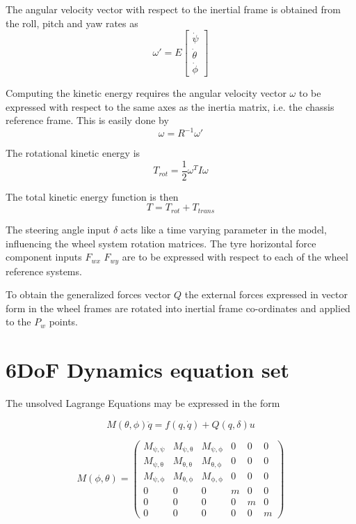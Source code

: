 The angular velocity vector with respect to the inertial frame is obtained from the roll, pitch and yaw rates as
$$
\omega' = E\begin{bmatrix}
\dot\psi \\
\dot\theta \\
\dot\phi
\end{bmatrix}
$$

Computing the kinetic energy requires the angular velocity vector $\omega$ to be expressed with respect to the same axes as the inertia matrix, i.e. the chassis reference frame. This is easily done by
$$\omega = R^{-1}\omega'$$

The rotational kinetic energy is
$$ T_{rot} = \frac{1}{2}\omega^T I \omega $$

The total kinetic energy function is then
$$ T = T_{rot} + T_{trans} $$

The steering angle input $\delta$ acts like a time varying parameter in the model, influencing the wheel system rotation matrices.
The tyre horizontal force component inputs $F_{wx}$ $F_{wy}$ are to be expressed with respect to each of the wheel reference systems.

To obtain the generalized forces vector $Q$ the external forces expressed in vector form in the wheel frames are rotated into inertial frame co-ordinates and applied to the $P_w$ points.

\section{6DoF Dynamics equation set}
\label{sec:6dofeq}
The unsolved Lagrange Equations may be expressed in the form

$$M(\theta,\phi)\ddot q = f(q, \dot q) + Q(q,\delta)u$$

$$
M(\phi,\theta)=\left(\begin{array}{cccccc} M_{\mathrm{\psi},\mathrm{\psi}} & M_{\mathrm{\psi},\mathrm{\theta}} & M_{\mathrm{\psi},\mathrm{\phi}} & 0 & 0 & 0\\ M_{\mathrm{\psi},\mathrm{\theta}} & M_{\mathrm{\theta},\mathrm{\theta}} & M_{\mathrm{\theta},\mathrm{\phi}} & 0 & 0 & 0\\ M_{\mathrm{\psi},\mathrm{\phi}} & M_{\mathrm{\theta},\mathrm{\phi}} & M_{\mathrm{\phi},\mathrm{\phi}} & 0 & 0 & 0\\ 0 & 0 & 0 & m & 0 & 0\\ 0 & 0 & 0 & 0 & m & 0\\ 0 & 0 & 0 & 0 & 0 & m \end{array}\right)
$$

